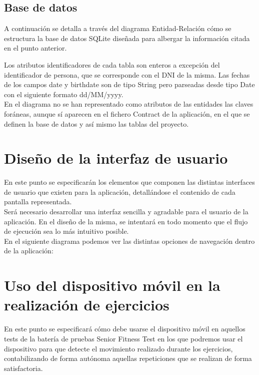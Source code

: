 \subsection{Base de datos}

A continuación se detalla a través del diagrama Entidad-Relación cómo se estructura la base de datos SQLite diseñada para albergar la información citada en el punto anterior.


Los atributos identificadores de cada tabla son enteros a excepción del identificador de persona, que se corresponde con el DNI de la misma. Las fechas de los campos date y birthdate son de tipo String pero parseadas desde tipo Date con el siguiente formato dd/MM/yyyy.\\

En el diagrama no se han representado como atributos de las entidades las claves foráneas, aunque sí aparecen en el fichero Contract de la aplicación, en el que se definen la base de datos y así mismo las tablas del proyecto.

\section{Diseño de la interfaz de usuario}

En este punto se especificarán los elementos que componen las distintas interfaces de usuario que existen para la aplicación, detallándose el contenido de cada pantalla representada.\\

Será necesario desarrollar una interfaz sencilla y agradable para el usuario de la aplicación. En el diseño de la misma, se intentará en todo momento que el flujo de ejecución sea lo más intuitivo posible.\\

En el siguiente diagrama podemos ver las distintas opciones de navegación dentro de la aplicación:

\section{Uso del dispositivo móvil en la realización de ejercicios}

En este punto se especificará cómo debe usarse el dispositivo móvil en aquellos tests de la batería de pruebas Senior Fitness Test en los que podremos usar el dispositivo para que detecte el movimiento realizado durante los ejercicios, contabilizando de forma autónoma aquellas repeticiones que se realizan de forma satisfactoria.

